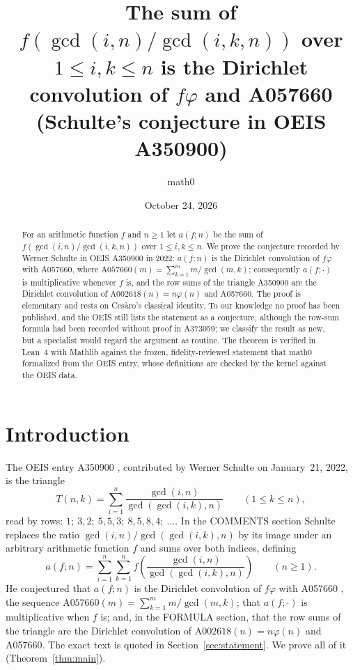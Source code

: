 \documentclass[11pt]{amsart}
\title[Schulte's gcd-ratio double sum (OEIS A350900)]{The sum of $f(\gcd(i,n)/\gcd(i,k,n))$ over $1\le i,k\le n$ is the Dirichlet convolution of $f\varphi$ and A057660 (Schulte's conjecture in OEIS A350900)}
\author{math0}
\date{October 24, 2026}
\theoremstyle{plain}
\theoremstyle{definition}
\newcommand{\A}[1]{\mathrm{A#1}}
\begin{document}
\begin{abstract}
For an arithmetic function $f$ and $n\ge1$ let $a(f;n)$ be the sum of $f(\gcd(i,n)/\gcd(i,k,n))$ over $1\le i,k\le n$.
We prove the conjecture recorded by Werner Schulte in OEIS A350900 in 2022: $a(f;n)$ is the Dirichlet convolution of $f\varphi$ with A057660, where $\A{057660}(m)=\sum_{k=1}^{m}m/\gcd(m,k)$; consequently $a(f;\cdot)$ is multiplicative whenever $f$ is, and the row sums of the triangle A350900 are the Dirichlet convolution of $\A{002618}(n)=n\varphi(n)$ and A057660.
The proof is elementary and rests on Ces\`aro's classical identity.
To our knowledge no proof has been published, and the OEIS still lists the statement as a conjecture, although the row-sum formula had been recorded without proof in A373059; we classify the result as new, but a specialist would regard the argument as routine.
The theorem is verified in Lean~4 with Mathlib against the frozen, fidelity-reviewed statement that math0 formalized from the OEIS entry, whose definitions are checked by the kernel against the OEIS data.
\end{abstract}
\maketitle

\section{Introduction}

The OEIS entry A350900 \cite{A350900}, contributed by Werner Schulte on January~21, 2022, is the triangle
\[
  T(n,k)=\sum_{i=1}^{n}\frac{\gcd(i,n)}{\gcd(\gcd(i,k),n)}\qquad(1\le k\le n),
\]
read by rows: $1;\ 3,2;\ 5,5,3;\ 8,5,8,4;\ \dots$. In the COMMENTS section Schulte replaces the ratio $\gcd(i,n)/\gcd(\gcd(i,k),n)$ by its image under an arbitrary arithmetic function $f$ and sums over both indices, defining
\begin{equation}\label{eq:aF}
  a(f;n)=\sum_{i=1}^{n}\sum_{k=1}^{n}f\!\left(\frac{\gcd(i,n)}{\gcd(\gcd(i,k),n)}\right)\qquad(n\ge1).
\end{equation}
He conjectured that $a(f;n)$ is the Dirichlet convolution of $f\varphi$ with A057660 \cite{A057660}, the sequence $\A{057660}(m)=\sum_{k=1}^{m}m/\gcd(m,k)$; that $a(f;\cdot)$ is multiplicative when $f$ is; and, in the FORMULA section, that the row sums of the triangle are the Dirichlet convolution of $\A{002618}(n)=n\varphi(n)$ \cite{A002618} and A057660. The exact text is quoted in Section~\ref{sec:statement}. We prove all of it (Theorem~\ref{thm:main}).
\end{document}

